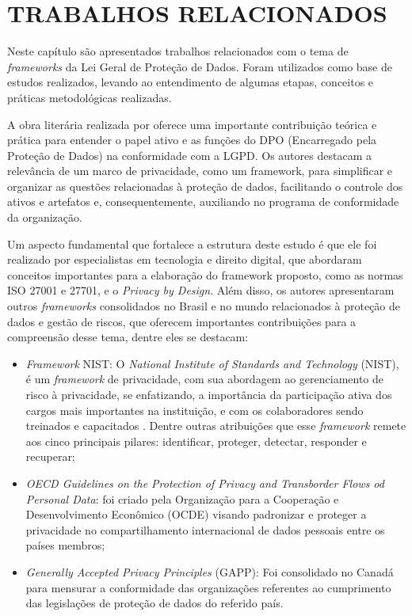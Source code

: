 \documentclass[
	12pt,				%
	openright,			%
	oneside,			%
	a4paper,			%
	english,			%
	french,				%
	spanish,			%
	brazil,				%
	]{abntex2}
\begin{document}

\chapter{TRABALHOS RELACIONADOS}
\label{ch: trabalhos relacionados}

Neste capítulo são apresentados trabalhos relacionados com o tema de \textit{frameworks} da Lei Geral de Proteção de Dados. Foram utilizados como base de estudos realizados, levando ao entendimento de algumas etapas, conceitos e práticas metodológicas realizadas.

A obra literária realizada por \cite{Blum2020} oferece uma importante contribuição teórica e prática para entender o papel ativo e as funções do DPO (Encarregado pela Proteção de Dados) na conformidade com a LGPD. Os autores destacam a relevância de um marco de privacidade, como um framework, para simplificar e organizar as questões relacionadas à proteção de dados, facilitando o controle dos ativos e artefatos e, consequentemente, auxiliando no programa de conformidade da organização.

Um aspecto fundamental que fortalece a estrutura deste estudo é que ele foi realizado por especialistas em tecnologia e direito digital, que abordaram conceitos importantes para a elaboração do framework proposto, como as normas ISO 27001 e 27701, e o \textit{Privacy by Design}. Além disso, os autores apresentaram outros \textit{frameworks} consolidados no Brasil e no mundo relacionados à proteção de dados e gestão de riscos, que oferecem importantes contribuições para a compreensão desse tema, dentre eles se destacam:

\begin{itemize}
\item \textit{Framework} NIST: O \textit{National Institute of Standards and Technology}  (NIST), é um \textit{framework} de privacidade, com sua abordagem ao gerenciamento de risco à privacidade, se enfatizando, a importância da participação ativa dos cargos mais importantes na instituição, e com os colaboradores sendo treinados e capacitados \cite{Blum2020}. Dentre outras atribuições que esse \textit{framework} remete aos cinco principais pilares: identificar, proteger, detectar, responder e recuperar; 
\item \textit{OECD Guidelines on the Protection of Privacy and Transborder Flows od Personal Data}: foi criado pela Organização para a Cooperação e Desenvolvimento Econômico (OCDE) visando padronizar e proteger a privacidade no compartilhamento internacional de dados pessoais entre os países membros;
\item \textit{Generally Accepted Privacy Principles} (GAPP): Foi consolidado no Canadá para mensurar a conformidade das organizações referentes ao cumprimento das legislações de proteção de dados do referido país. 

\end{itemize}
\end{document}
